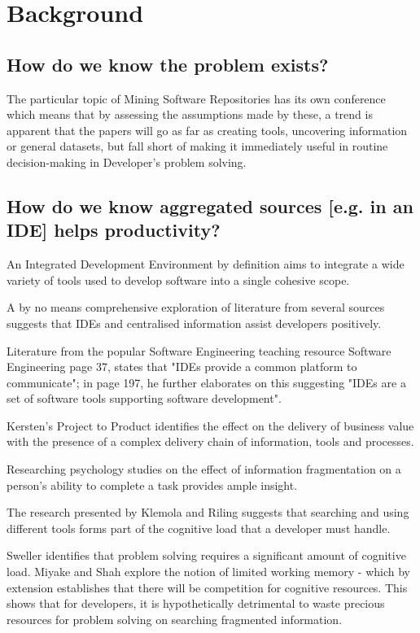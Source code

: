 \chapter{Background}
\section{How do we know the problem exists?}

The particular topic of Mining Software Repositories has its own conference \parencite{Storey:2019:3341883} which means that by assessing the assumptions made by these, a trend is apparent that the papers will go as far as creating tools, uncovering information or general datasets, but fall short of making it immediately useful in routine decision-making in Developer's problem solving.

\section{How do we know aggregated sources [e.g. in an IDE] helps productivity?}

An Integrated Development Environment by definition aims to integrate a wide variety of tools used to develop software into a single cohesive scope. 

A by no means comprehensive exploration of literature from several sources suggests that IDEs and centralised information assist developers positively. 

Literature from the popular Software Engineering teaching resource Software Engineering \parencite{Sommerville:2010:SE:1841764} page 37, states that "IDEs provide a common platform to communicate"; in page 197, he further elaborates on this suggesting "IDEs are a set of software tools supporting software development".

Kersten's Project to Product \parencite*{kersten2018projecproduct} identifies the effect on the delivery of business value with the presence of a complex delivery chain of information, tools and processes.

Researching psychology studies on the effect of information fragmentation on a person's ability to complete a task provides ample insight. 

The research presented by Klemola and Riling \parencite*{klemola2002modeling} suggests that searching and using different tools forms part of the cognitive load that a developer must handle.

Sweller \parencite*{sweller1998cognitive} identifies that problem solving requires a significant amount of cognitive load. Miyake and Shah \parencite*{miyake1999models} explore the notion of limited working memory - which by extension establishes that there will be competition for cognitive resources. This shows that for developers, it is hypothetically detrimental to waste precious resources for problem solving on searching fragmented information.


